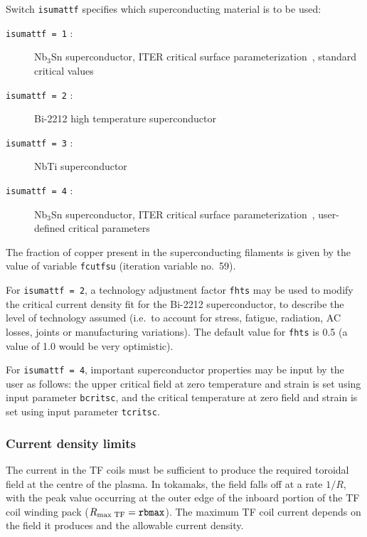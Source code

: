 \documentclass[11pt,a4paper]{report}
\begin{document}
Switch \texttt{isumattf} specifies which superconducting material is to be
used:
\begin{description}
\item [\texttt{isumattf = 1} :] Nb$_3$Sn superconductor, ITER critical surface
  parameterization~\cite{iter_nb3sn}, standard critical values
\item [\texttt{isumattf = 2} :] Bi-2212 high temperature superconductor %
\item [\texttt{isumattf = 3} :] NbTi superconductor
\item [\texttt{isumattf = 4} :] Nb$_3$Sn superconductor, ITER critical surface
  parameterization~\cite{iter_nb3sn}, user-defined critical parameters
\end{description}
The fraction of copper present in the superconducting filaments is given by
the value of variable \texttt{fcutfsu} (iteration variable no.\ 59).

For \texttt{isumattf = 2}, a technology adjustment factor \texttt{fhts} may be
used to modify the critical current density fit for the Bi-2212
superconductor, to describe the level of technology assumed (i.e.\ to account
for stress, fatigue, radiation, AC losses, joints or manufacturing variations).
The default value for \texttt{fhts} is 0.5 (a value of 1.0 would be very
optimistic).

For \texttt{isumattf = 4}, important superconductor properties may be input by
the user as follows: the upper critical field at zero temperature and strain
is set using input parameter \texttt{bcritsc}, and the critical temperature at
zero field and strain is set using input parameter \texttt{tcritsc}.

\subsubsection{Current density limits}

The current in the TF coils must be sufficient to produce the required
toroidal field at the centre of the plasma. In tokamaks, the field falls off
at a rate $1/R$, with the peak value occurring at the outer edge of the
inboard portion of the TF coil winding pack ($R_{\mbox{\scriptsize max TF}} =
\mathtt{rbmax}$). The maximum TF coil current depends on the field it produces
and the allowable current density.

\newcommand{\jop}{$J_{\mbox{\scriptsize op}}$ }
\newcommand{\jcrit}{$J_{\mbox{\scriptsize crit}}$}
\end{document}
